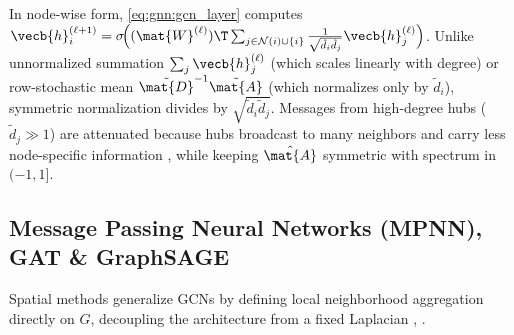 \documentclass[../../../../master.tex]{subfiles}
\begin{document}
\begin{intuition}
\label{box:gnn:kipf_intuition}
In node-wise form, \eqref{eq:gnn:gcn_layer} computes $\vecb{h}_i^{(\ell+1)} = \sigma\!\Big((\mat{W}^{(\ell)})\T \sum_{j \in \mathcal{N}(i)\cup\{i\}} \frac{1}{\sqrt{\tilde{d}_i \tilde{d}_j}} \vecb{h}_j^{(\ell)}\Big)$. Unlike unnormalized summation $\sum_j \vecb{h}_j^{(\ell)}$ (which scales linearly with degree) or row-stochastic mean $\tilde{\mat{D}}^{-1}\tilde{\mat{A}}$ (which normalizes only by $\tilde{d}_i$), symmetric normalization divides by $\sqrt{\tilde{d}_i \tilde{d}_j}$. Messages from high-degree hubs ($\tilde{d}_j \gg 1$) are attenuated because hubs broadcast to many neighbors and carry less node-specific information , while keeping $\hat{\mat{A}}$ symmetric with spectrum in $(-1, 1]$.
\end{intuition}

\subsection{Message Passing Neural Networks (MPNN), GAT \& GraphSAGE}
\label{sec:gnn:mpnn}

Spatial methods generalize GCNs by defining local neighborhood aggregation directly on $G$, decoupling the architecture from a fixed Laplacian , .
\end{document}
